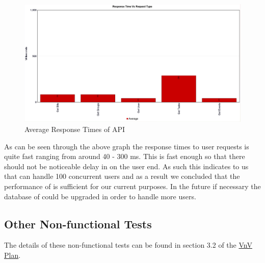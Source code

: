 \documentclass[12pt, titlepage]{article}
\begin{document}
\begin{figure}[H]
    \centering
    \hspace*{-1cm}
    \includegraphics[width=1.25\linewidth]{Response_Time.png}
    \caption{Average Response Times of \progname{} API}
    \label{fig:responsetimegraph}
\end{figure}

As can be seen through the above graph the response times to user requests is quite fast ranging from around  40 - 300 ms. This is fast enough so that there should not be noticeable delay in \progname{} on the user end. As such this indicates to us that \progname{} can handle 100 concurrent users and as a result we concluded that the performance of \progname{} is sufficient for our current purposes. In the future if necessary the database of \progname{} could be upgraded in order to handle more users.


\subsection{Other Non-functional Tests}

The details of these non-functional tests can be found in section 3.2 of the \href{https://github.com/DangJustin/CapstoneProject/blob/main/docs/VnVPlan/VnVPlan.pdf}{VnV Plan}.
\end{document}
